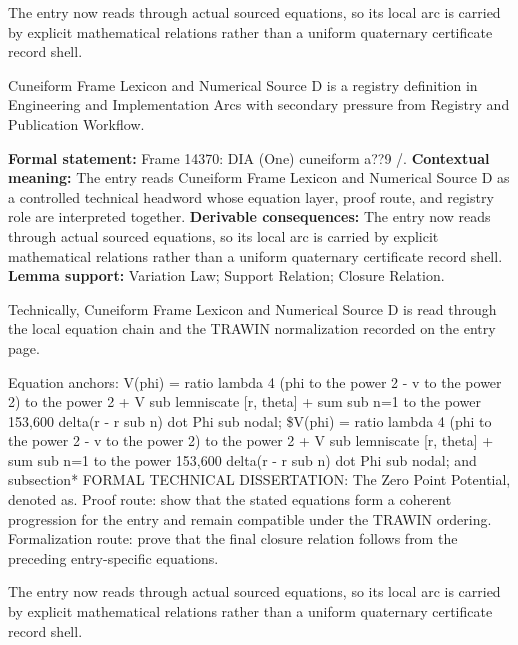 The entry now reads through actual sourced equations, so its local arc is carried by explicit mathematical relations rather than a uniform quaternary certificate record shell.
\clearpage


\begingroup\small
{}
Cuneiform Frame Lexicon and Numerical Source D is a registry definition in Engineering and Implementation Arcs with secondary pressure from Registry and Publication Workflow.

\begingroup\footnotesize\setlength{\emergencystretch}{3em}\sloppy
\textbf{Formal statement:} Frame 14370: DIA (One) cuneiform a??9 /. \textbf{Contextual meaning:} The entry reads Cuneiform Frame Lexicon and Numerical Source D as a controlled technical headword whose equation layer, proof route, and registry role are interpreted together. \textbf{Derivable consequences:} The entry now reads through actual sourced equations, so its local arc is carried by explicit mathematical relations rather than a uniform quaternary certificate record shell. \textbf{Lemma support:} Variation Law; Support Relation; Closure Relation.\par
\endgroup

Technically, Cuneiform Frame Lexicon and Numerical Source D is read through the local equation chain and the TRAWIN normalization recorded on the entry page.

Equation anchors: V(phi) = ratio lambda 4 (phi to the power 2 - v to the power 2) to the power 2 + V sub lemniscate [r, theta] + sum sub n=1 to the power 153,600 delta(r - r sub n) dot Phi sub nodal; \$V(phi) = ratio lambda 4 (phi to the power 2 - v to the power 2) to the power 2 + V sub lemniscate [r, theta] + sum sub n=1 to the power 153,600 delta(r - r sub n) dot Phi sub nodal; and subsection* FORMAL TECHNICAL DISSERTATION: The Zero Point Potential, denoted as. Proof route: show that the stated equations form a coherent progression for the entry and remain compatible under the TRAWIN ordering. Formalization route: prove that the final closure relation follows from the preceding entry-specific equations.

The entry now reads through actual sourced equations, so its local arc is carried by explicit mathematical relations rather than a uniform quaternary certificate record shell.
\endgroup

